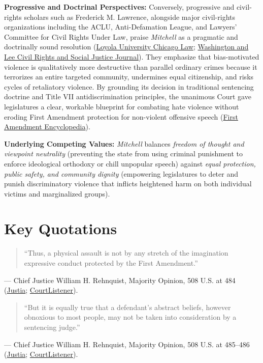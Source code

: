 \documentclass[12pt]{article}
\begin{document}
\textbf{Progressive and Doctrinal Perspectives:} Conversely, progressive and civil-rights scholars such as Frederick M. Lawrence, alongside major civil-rights organizations including the ACLU, Anti-Defamation League, and Lawyers' Committee for Civil Rights Under Law, praise \textit{Mitchell} as a pragmatic and doctrinally sound resolution (\href{https://lawecommons.luc.edu/cgi/viewcontent.cgi?article=1263&context=facpubs}{Loyola University Chicago Law}; \href{https://scholarlycommons.law.wlu.edu/cgi/viewcontent.cgi?article=1015&context=crsj}{Washington and Lee Civil Rights and Social Justice Journal}). They emphasize that bias-motivated violence is qualitatively more destructive than parallel ordinary crimes because it terrorizes an entire targeted community, undermines equal citizenship, and risks cycles of retaliatory violence. By grounding its decision in traditional sentencing doctrine and Title VII antidiscrimination principles, the unanimous Court gave legislatures a clear, workable blueprint for combating hate violence without eroding First Amendment protection for non-violent offensive speech (\href{https://firstamendment.mtsu.edu/article/wisconsin-v-mitchell/}{First Amendment Encyclopedia}).

\textbf{Underlying Competing Values:} \textit{Mitchell} balances \textit{freedom of thought and viewpoint neutrality} (preventing the state from using criminal punishment to enforce ideological orthodoxy or chill unpopular speech) against \textit{equal protection, public safety, and community dignity} (empowering legislatures to deter and punish discriminatory violence that inflicts heightened harm on both individual victims and marginalized groups).

\section{Key Quotations}

\begin{quote}
``Thus, a physical assault is not by any stretch of the imagination expressive conduct protected by the First Amendment.''
\end{quote}
\noindent --- Chief Justice William H. Rehnquist, Majority Opinion, 508 U.S. at 484 (\href{https://supreme.justia.com/cases/federal/us/508/476/}{Justia}; \href{https://www.courtlistener.com/opinion/112879/wisconsin-v-mitchell/}{CourtListener}).

\begin{quote}
``But it is equally true that a defendant's abstract beliefs, however obnoxious to most people, may not be taken into consideration by a sentencing judge.''
\end{quote}
\noindent --- Chief Justice William H. Rehnquist, Majority Opinion, 508 U.S. at 485--486 (\href{https://supreme.justia.com/cases/federal/us/508/476/}{Justia}; \href{https://www.courtlistener.com/opinion/112879/wisconsin-v-mitchell/}{CourtListener}).
\end{document}
